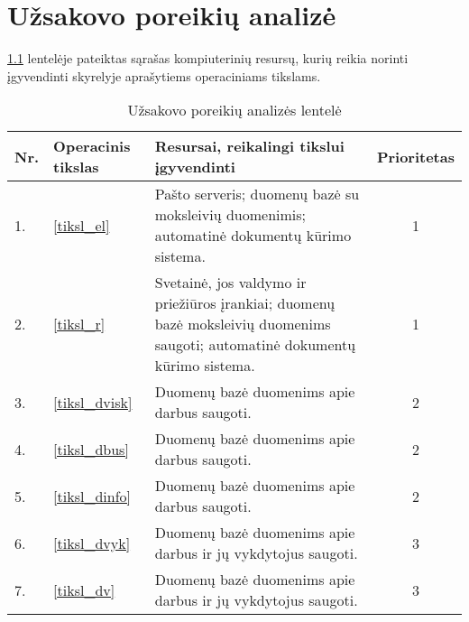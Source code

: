 \chapter{Užsakovo poreikių analizė}

\ref{tab:poreikiai} lentelėje pateiktas sąrašas kompiuterinių resursų, 
kurių reikia norinti įgyvendinti \emph{}
skyrelyje aprašytiems operaciniams tikslams.

\begin{table}
  \centering
  \begin{tabular}[]{| l | p{1.6cm} | p{5.8cm} | c |}
    \hline
    Nr. & Operacinis tikslas & Resursai, reikalingi tikslui įgyvendinti &
    Prioritetas \\
    \hline
    1. & \ref{tiksl_el} & 
      Pašto serveris; duomenų bazė su moksleivių duomenimis; automatinė 
      dokumentų kūrimo sistema. & 1 \\
    \hline
    2. & \ref{tiksl_r} & 
      Svetainė, jos valdymo ir priežiūros įrankiai; duomenų bazė moksleivių
      duomenims saugoti; automatinė dokumentų kūrimo sistema. & 1 \\
    \hline
    3. & \ref{tiksl_dvisk} &
      Duomenų bazė duomenims apie darbus saugoti. & 2 \\
    \hline
    4. & \ref{tiksl_dbus} &
      Duomenų bazė duomenims apie darbus saugoti. & 2 \\
    \hline
    5. & \ref{tiksl_dinfo} &
      Duomenų bazė duomenims apie darbus saugoti. & 2 \\
    \hline
    6. & \ref{tiksl_dvyk} &
      Duomenų bazė duomenims apie darbus ir jų vykdytojus saugoti. & 3 \\
    \hline
    7. & \ref{tiksl_dv} &
      Duomenų bazė duomenims apie darbus ir jų vykdytojus saugoti. & 3 \\
    \hline
  \end{tabular}
  \caption{Užsakovo poreikių analizės lentelė}
  \label{tab:poreikiai}
\end{table}
